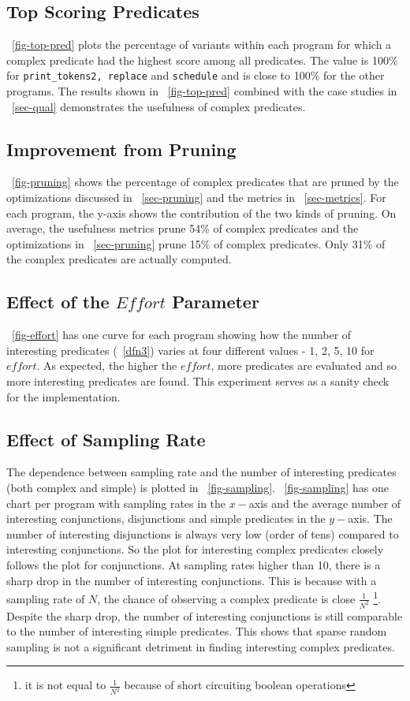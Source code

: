 \subsection{Top Scoring Predicates}
~\autoref{fig-top-pred} plots the percentage of variants within each program for which a complex predicate had the highest score among all predicates.  The value is 100\% for \texttt{print\_tokens2, replace} and \texttt{schedule} and is close to 100\% for the other programs.  The results shown in ~\autoref{fig-top-pred} combined with the case studies in ~\autoref{sec-qual} demonstrates the usefulness of complex predicates.

\subsection{Improvement from Pruning}
~\autoref{fig-pruning} shows the percentage of complex predicates that are pruned by the optimizations discussed in ~\autoref{sec-pruning} and the metrics in ~\autoref{sec-metrics}.  For each program, the y-axis shows the contribution of the two kinds of pruning.  On average, the usefulness metrics prune 54\% of complex predicates and the optimizations in ~\autoref{sec-pruning} prune 15\% of complex predicates.  Only 31\% of the complex predicates are actually computed.

\subsection{Effect of the $Effort$ Parameter}
~\autoref{fig-effort} has one curve for each program showing how the number of interesting predicates (~\autoref{dfn3}) varies at four different values - 1, 2, 5, 10 for $effort$.  As expected, the higher the $effort$, more predicates are evaluated and so more interesting predicates are found.  This experiment serves as a sanity check for the implementation.

\subsection{Effect of Sampling Rate}
\label{sec-sampling}
The dependence between sampling rate and the number of interesting predicates (both complex and simple) is plotted in ~\autoref{fig-sampling}.  ~\autoref{fig-sampling} has one chart per program with sampling rates in the $x-$axis and the average number of interesting conjunctions, disjunctions and simple predicates in the $y-$axis.  The number of interesting disjunctions is always very low (order of tens) compared to interesting conjunctions.  So the plot for interesting complex predicates closely follows the plot for conjunctions.  At sampling rates higher than 10, there is a sharp drop in the number of interesting conjunctions.  This is because with a sampling rate of $N$, the chance of observing a complex predicate is close $\frac{1}{N^2}$ {\footnote{it is not equal to $\frac{1}{N^2}$ because of short circuiting boolean operations}}.  Despite the sharp drop, the number of interesting conjunctions is still comparable to the number of interesting simple predicates.  This shows that sparse random sampling is not a significant detriment in finding interesting complex predicates.

